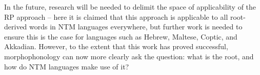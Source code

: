 \documentclass[12pt,twoside,letterpaper]{article}
\begin{document}
In the future, research will be needed to delimit the space of applicability of the RP approach -- here it is claimed that this approach is applicable to all root-derived words in NTM languages everywhere, but further work is needed to ensure this is the case for languages such as Hebrew, Maltese, Coptic, and Akkadian. However, to the extent that this work has proved successful, morphophonology can now more clearly ask the question: what is the root, and how do NTM languages make use of it?

\clearpage



\vspace{12pt}





\vspace{6pt}


\end{document}
